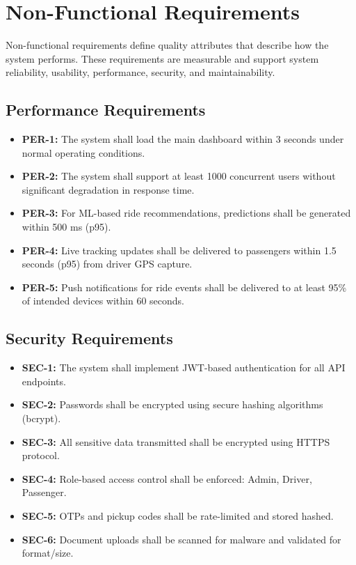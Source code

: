 \section{Non-Functional Requirements}

Non-functional requirements define quality attributes that describe how the system performs. These requirements are measurable and support system reliability, usability, performance, security, and maintainability.

\subsection{Performance Requirements}
\begin{itemize}
\item \textbf{PER-1:} The system shall load the main dashboard within 3 seconds under normal operating conditions.
\item \textbf{PER-2:} The system shall support at least 1000 concurrent users without significant degradation in response time.
\item \textbf{PER-3:} For ML-based ride recommendations, predictions shall be generated within 500 ms (p95).
\item \textbf{PER-4:} Live tracking updates shall be delivered to passengers within 1.5 seconds (p95) from driver GPS capture.
\item \textbf{PER-5:} Push notifications for ride events shall be delivered to at least 95\% of intended devices within 60 seconds.
\end{itemize}

\subsection{Security Requirements}
\begin{itemize}
\item \textbf{SEC-1:} The system shall implement JWT-based authentication for all API endpoints.
\item \textbf{SEC-2:} Passwords shall be encrypted using secure hashing algorithms (bcrypt).
\item \textbf{SEC-3:} All sensitive data transmitted shall be encrypted using HTTPS protocol.
\item \textbf{SEC-4:} Role-based access control shall be enforced: Admin, Driver, Passenger.
\item \textbf{SEC-5:} OTPs and pickup codes shall be rate-limited and stored hashed.
\item \textbf{SEC-6:} Document uploads shall be scanned for malware and validated for format/size.
\end{itemize}

